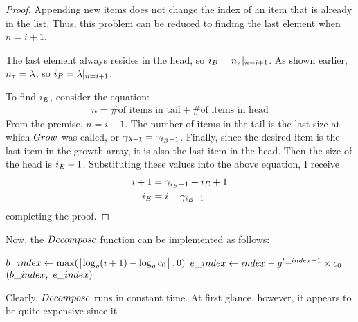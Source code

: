 \begin{proof}
	Appending new items does not change the index of an item that is already in the list. Thus, this problem can be reduced to finding the last element when $n = i + 1$.
	
	The last element always resides in the head, so $i_B = n_\tau|_{n = i + 1}$. As shown earlier, $n_\tau = \lambda$, so $i_B = \lambda|_{n = i + 1}$.
	
	To find $i_E$, consider the equation:
	\begin{align*}
	n = \text{\# of items in tail} + \text{\# of items in head}
	\end{align*}
	From the premise, $n = i + 1$. The number of items in the tail is the last size at which $Grow$ was called, or $\gamma_{\lambda - 1} = \gamma_{i_B - 1}$. Finally, since the desired item is the last item in the growth array, it is also the last item in the head. Then the size of the head is $i_E + 1$. Substituting these values into the above equation, I receive
	\begin{align*}
	i + 1 &= \gamma_{i_B - 1} + i_E + 1\\
	i_E &= i - \gamma_{i_B - 1}
	\end{align*}
	completing the proof.
\end{proof}

Now, the $\FuncDecompose$ function can be implemented as follows:

\begin{algorithm}
	\begin{algorithmic}
		\Function{$\FuncDecompose$}{$\ParamIndex$}
			\State $b\_index \gets \max(\left\lceil \log_{g} (i + 1) - \log_{g} c_0 \right\rceil, 0)$
			\State $e\_index \gets index - g^{b\_index - 1} \times c_0$
			\State \Return $(\LclIndexBuffer,\ \LclIndexElement)$
		\EndFunction
	\end{algorithmic}
\end{algorithm}

Clearly, $\FuncDecompose$ runs in constant time. At first glance, however, it appears to be quite expensive since it %